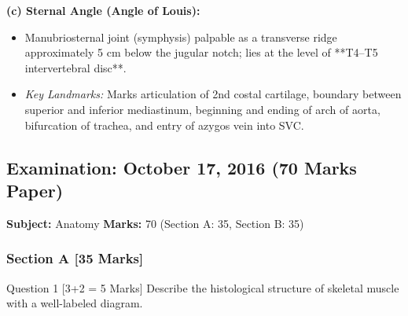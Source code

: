\documentclass[11pt,a4paper]{article}
\begin{document}
\begin{ansbox}
\textbf{(c) Sternal Angle (Angle of Louis):}
\begin{itemize}[leftmargin=*]
    \item Manubriosternal joint (symphysis) palpable as a transverse ridge approximately 5 cm below the jugular notch; lies at the level of **T4--T5 intervertebral disc**.
    \item \textit{Key Landmarks:} Marks articulation of 2nd costal cartilage, boundary between superior and inferior mediastinum, beginning and ending of arch of aorta, bifurcation of trachea, and entry of azygos vein into SVC.
\end{itemize}
\end{ansbox}

\newpage
\subsection{Examination: October 17, 2016 (70 Marks Paper)}
\textbf{Subject:} Anatomy \quad \textbf{Marks:} 70 (Section A: 35, Section B: 35)

\subsubsection{Section A [35 Marks]}

\begin{qbox}{Question 1 [3+2 = 5 Marks]}
Describe the histological structure of skeletal muscle with a well-labeled diagram.
\end{qbox}
\end{document}
